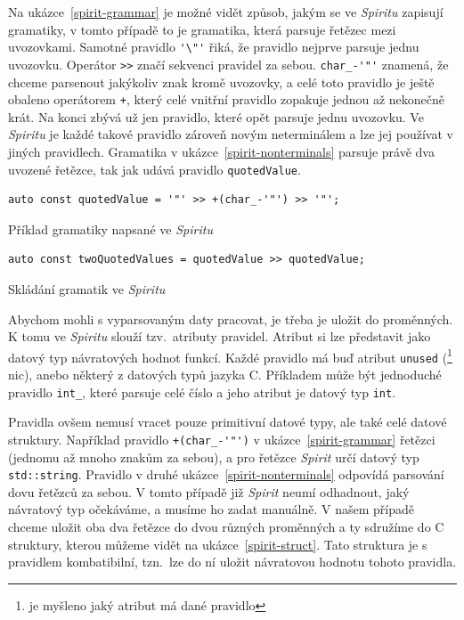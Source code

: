 \documentclass[thesis=B,czech,hidelinks]{FITthesis}[2019/03/06]
\newcommand{\Rplus}{\protect\hspace{-.1em}\protect\raisebox{.35ex}{\smaller{\smaller\textbf{+}}}}
\newcommand{\Cpp}{\mbox{C\Rplus\Rplus}\xspace}
\begin{document}
Na ukázce~\ref{spirit-grammar} je možné vidět způsob, jakým se ve \textit{Spiritu} zapisují gramatiky, v tomto případě to je gramatika, která parsuje řetězec mezi uvozovkami. Samotné pravidlo \verb|'\"'| řiká, že pravidlo nejprve parsuje jednu uvozovku. Operátor \verb|>>| značí sekvenci pravidel za sebou. \verb|char_-'"'| znamená, že chceme parsenout jakýkoliv znak kromě uvozovky, a celé toto pravidlo je ještě obaleno operátorem \verb|+|, který celé vnitřní pravidlo zopakuje jednou až nekonečně krát. Na konci zbývá už jen pravidlo, které opět parsuje jednu uvozovku. Ve \textit{Spiritu} je každé takové pravidlo zároveň novým neterminálem a lze jej používat v jiných pravidlech. Gramatika v ukázce~\ref{spirit-nonterminals} parsuje právě dva uvozené řetězce, tak jak udává pravidlo \texttt{quotedValue}.

\begin{listing}
\begin{verbatim}
auto const quotedValue = '"' >> +(char_-'"') >> '"';
\end{verbatim}
\caption{Příklad gramatiky napsané ve \textit{Spiritu}}\label{spirit-grammar}
\end{listing}

\begin{listing}
\begin{verbatim}
auto const twoQuotedValues = quotedValue >> quotedValue;
\end{verbatim}
\caption{Skládání gramatik ve \textit{Spiritu}}\label{spirit-nonterminals}
\end{listing}

Abychom mohli s vyparsovaným daty pracovat, je třeba je uložit do proměnných. K tomu ve \textit{Spiritu} slouží tzv.\ atributy pravidel. Atribut si lze představit jako datový typ návratových hodnot funkcí. Každé pravidlo má buď atribut \texttt{unused} (\footnote{ je myšleno jaký atribut má dané pravidlo} nic), anebo některý z datových typů jazyka \Cpp{}. Příkladem může být jednoduché pravidlo \verb|int_|, které parsuje celé číslo a jeho atribut je datový typ \texttt{int}.

Pravidla ovšem nemusí vracet pouze primitivní datové typy, ale také celé datové struktury. Například pravidlo \verb|+(char_-'"')| v ukázce~\ref{spirit-grammar} řetězci (jednomu až mnoho znakům za sebou), a pro řetězce \textit{Spirit} určí datový typ \texttt{std::string}. Pravidlo v druhé ukázce~\ref{spirit-nonterminals} odpovídá parsování dovu řetězců za sebou. V tomto případě již \textit{Spirit} neumí odhadnout, jaký návratový typ očekáváme, a musíme ho zadat manuálně. V našem případě chceme uložit oba dva řetězce do dvou různých proměnných a ty sdružíme do \Cpp{} struktury, kterou můžeme vidět na ukázce~\ref{spirit-struct}. Tato struktura je s pravidlem kombatibilní, tzn.\ lze do ní uložit návratovou hodnotu tohoto pravidla.
\end{document}
